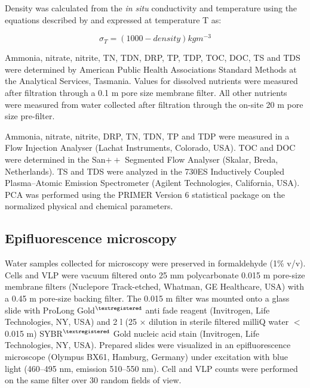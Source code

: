 Density was calculated from the \emph{in situ} conductivity and temperature using the equations described by \citet{Gibson1990} and expressed at temperature T as:

\begin{equation}
\sigma_T = (1000 - density) kg m^{-3}
\label{eqn:density}
\end{equation}

Ammonia, nitrate, nitrite, \ac{TN}, \ac{TDN}, \ac{DRP}, \ac{TP}, \ac{TDP}, \ac{TOC}, \ac{DOC}, \ac{TS} and \ac{TDS} were determined by American Public Health Associations Standard Methods at the Analytical Services, Tasmania. 
Values for dissolved nutrients were measured after filtration through a 0.1 \textmu{}m pore size membrane filter. 
All other nutrients were measured from water collected after filtration through the on-site 20 \textmu{}m pore size pre-filter.
 
Ammonia, nitrate, nitrite, \ac{DRP}, \ac{TN}, \ac{TDN}, \ac{TP} and \ac{TDP} were measured in a Flow Injection Analyser (Lachat Instruments, Colorado, USA). 
\ac{TOC} and \ac{DOC} were determined in the San$++$ Segmented Flow Analyser (Skalar, Breda, Netherlands). 
\ac{TS} and \ac{TDS} were analyzed in the 730ES Inductively Coupled Plasma--Atomic Emission Spectrometer (Agilent Technologies, California, USA). 
\ac{PCA} was performed using the PRIMER Version 6 statistical package \cite{Clarke2006} on the normalized physical and chemical parameters.

\subsection{Epifluorescence microscopy}
Water samples collected for microscopy were preserved in formaldehyde (1\% v/v). 
Cells and \acs{VLP} were vacuum filtered onto 25 mm polycarbonate 0.015 \textmu{}m pore-size membrane filters (Nuclepore Track-etched, Whatman, GE Healthcare, USA) with a 0.45 \textmu{}m pore-size backing filter. 
The 0.015 \textmu{}m filter was mounted onto a glass slide with ProLong Gold$^{\textregistered}$ anti fade reagent (Invitrogen, Life Technologies, NY, USA) and 2 \textmu{}l (25 × dilution in sterile filtered milliQ water $<$ 0.015 \textmu{}m) SYBR$^{\textregistered}$ Gold nucleic acid stain (Invitrogen, Life Technologies, NY, USA). 
Prepared slides were visualized in an epifluorescence microscope (Olympus BX61, Hamburg, Germany) under excitation with blue light (460--495 nm, emission 510--550 nm). 
Cell and \ac{VLP} counts were performed on the same filter over 30 random fields of view.

